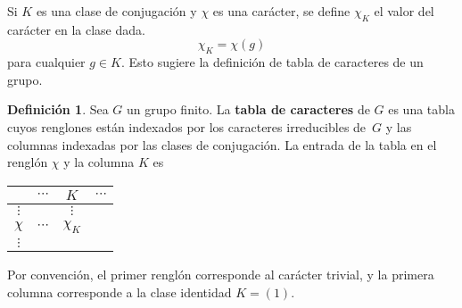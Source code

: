 \documentclass[12pt]{book}
\theoremstyle{definition}
\newtheorem{definition}[theorem]{Definición}
\newcounter{in}
\newcounter{ini}
\begin{document}
Si $K$ es una clase de conjugación y $\chi$ es una carácter, se define
$\chi_{K}$ el valor del carácter en la clase dada.
\begin{equation*}
  \chi_{K}=\chi(g)
\end{equation*}
para cualquier $g\in K$. Esto sugiere la definición de tabla de caracteres de
un grupo. 
\begin{definition}
  Sea $G$ un grupo finito. La \textbf{tabla de caracteres} de $G$ es
  una tabla cuyos renglones están indexados por los caracteres
  irreducibles de~$G$ y las columnas indexadas por las clases de
  conjugación. La entrada de la tabla en el renglón $\chi$ y la columna $K$ es
\end{definition}

\begin{center}
  \begin{tabular}{c |c c c}
    & $\cdots$ & $K$ & $\cdots$\\
    \hline
    $\vdots$ &  & $\vdots$  \\
    $\chi$   & $\cdots$ & $\chi_{K}$  \\
    $\vdots$ &          &   
  \end{tabular}
\end{center}
Por convención, el primer renglón corresponde al carácter trivial, y la
primera columna corresponde a la clase identidad $K=(1)$.
\end{document}
